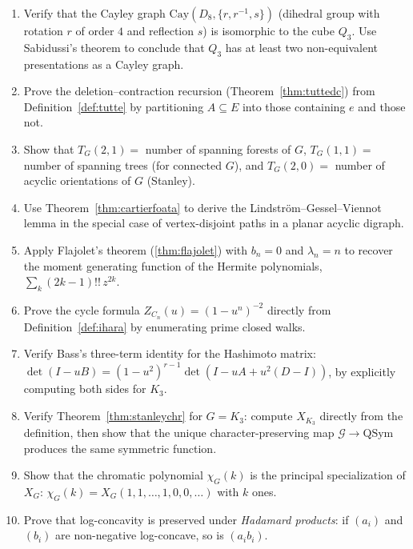 \begin{enumerate}[resume]
\item Verify that the Cayley graph $\mathrm{Cay}(D_8, \{r, r^{-1}, s\})$
(dihedral group with rotation $r$ of order $4$ and reflection $s$) is
isomorphic to the cube $Q_3$. Use Sabidussi's theorem to conclude that
$Q_3$ has at least two non-equivalent presentations as a Cayley graph.

\item Prove the deletion--contraction recursion (Theorem~\ref{thm:tuttedc})
from Definition~\ref{def:tutte} by partitioning $A \subseteq E$ into
those containing $e$ and those not.

\item Show that $T_G(2, 1) = $ number of spanning forests of $G$,
$T_G(1, 1) = $ number of spanning trees (for connected $G$), and
$T_G(2, 0) = $ number of acyclic orientations of $G$ (Stanley).

\item Use Theorem~\ref{thm:cartierfoata} to derive the Lindstr\"om--Gessel--Viennot
lemma in the special case of vertex-disjoint paths in a planar
acyclic digraph.

\item Apply Flajolet's theorem (\ref{thm:flajolet}) with $b_n = 0$ and
$\lambda_n = n$ to recover the moment generating function of the
Hermite polynomials, $\sum_k (2k - 1)!! \, z^{2k}$.

\item Prove the cycle formula $Z_{C_n}(u) = (1 - u^n)^{-2}$ directly from
Definition~\ref{def:ihara} by enumerating prime closed walks.

\item Verify Bass's three-term identity for the Hashimoto matrix:
$\det(I - u B) = (1 - u^2)^{r - 1} \det(I - u A + u^2 (D - I))$, by
explicitly computing both sides for $K_3$.

\item Verify Theorem~\ref{thm:stanleychr} for $G = K_3$: compute $X_{K_3}$
directly from the definition, then show that the unique character-preserving
map $\mathcal G \to \mathrm{QSym}$ produces the same symmetric function.

\item Show that the chromatic polynomial $\chi_G(k)$ is the principal
specialization of $X_G$:
$\chi_G(k) = X_G(1, 1, \ldots, 1, 0, 0, \ldots)$ with $k$ ones.

\item Prove that log-concavity is preserved under \emph{Hadamard products}:
if $(a_i)$ and $(b_i)$ are non-negative log-concave, so is
$(a_i b_i)$.


\end{enumerate}
